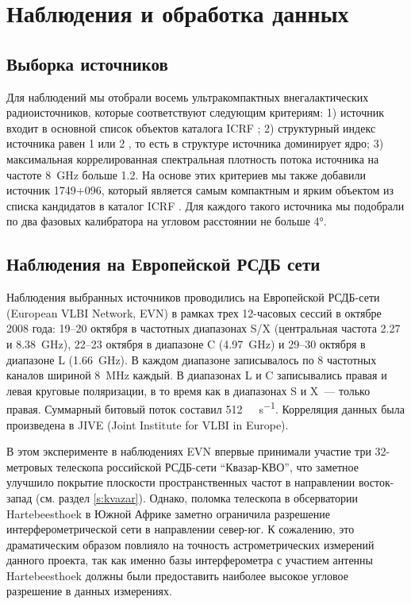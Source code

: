 \section{Наблюдения и обработка данных}

\subsection{Выборка источников}
Для наблюдений мы отобрали восемь ультракомпактных внегалактических радиоисточников, которые
соответствуют следующим критериям: 1) источник входит в основной список объектов каталога ICRF
\cite{Ma_1998}; 2) структурный индекс источника равен 1 или 2 \cite{Ma_1998}, то есть в структуре
источника доминирует ядро; 3) максимальная коррелированная спектральная плотность потока источника
на частоте \SI{8}{\GHz} больше \SI{1.2}{\jansky}. На основе этих критериев мы также добавили источник
1749+096, который является самым компактным и ярким объектом из списка кандидатов в каталог ICRF
\cite{Ma_1998}. Для каждого такого источника мы подобрали по два фазовых калибратора на угловом
расстоянии не больше \ang{4}.

\subsection{Наблюдения на Европейской РСДБ сети}

Наблюдения выбранных источников проводились на Европейской РСДБ-сети (European VLBI Network, EVN) в
рамках трех 12-часовых сессий в октябре 2008 года: 19--20 октября в частотных диапазонах S/X
(центральная частота 2.27 и \SI{8.38}{\GHz}), 22--23 октября в диапазоне C (\SI{4.97}{\GHz}) и
29--30 октября в диапазоне L (\SI{1.66}{\GHz}). В каждом диапазоне записывалось по 8 частотных
каналов шириной \SI{8}{MHz} каждый. В диапазонах L и C записывались правая и левая круговые
поляризации, в то время как в диапазонах S и X~--- только правая. Суммарный битовый поток составил
\SI{512}{\mega\bit\per\second}. Корреляция данных была произведена в JIVE (Joint Institute for VLBI
in Europe).

В этом эксперименте в наблюдениях EVN впервые принимали участие три 32-метровых телескопа российской
РСДБ-сети ``Квазар-КВО'', что заметное улучшило покрытие плоскости пространственных частот в
направлении восток-запад (см. раздел \ref{s:kvazar}). Однако, поломка телескопа в обсерватории
Hartebeesthoek в Южной Африке заметно ограничила разрешение интерферометрической сети в направлении
север-юг. К сожалению, это драматическим образом повлияло на точность астрометрических измерений
данного проекта, так как именно базы интерферометра с участием  антенны Hartebeesthoek должны были
предоставить наиболее высокое угловое разрешение в данных измерениях.

